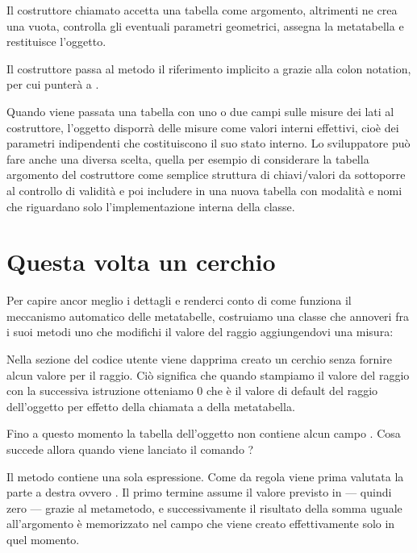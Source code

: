 Il costruttore chiamato  accetta una tabella come argomento, altrimenti
ne crea una vuota, controlla gli eventuali parametri geometrici, assegna la
metatabella e restituisce l'oggetto.

Il costruttore passa al metodo  il riferimento implicito a
 grazie alla colon notation, per cui  punterà a
.

Quando viene passata una tabella con uno o due campi sulle misure dei lati al
costruttore, l'oggetto disporrà delle misure come valori interni effettivi,
cioè dei parametri indipendenti che costituiscono il suo stato interno. Lo
sviluppatore può fare anche una diversa scelta, quella per esempio di
considerare la tabella argomento del costruttore come semplice struttura di
chiavi/valori da sottoporre al controllo di validità e poi includere in una
nuova tabella con modalità e nomi che riguardano solo l'implementazione interna
della classe.


\section{Questa volta un cerchio}

Per capire ancor meglio i dettagli e renderci conto di come funziona il
meccanismo automatico delle metatabelle, costruiamo una classe 
che annoveri fra i suoi metodi uno che modifichi il valore del raggio
aggiungendovi una misura:

Nella sezione del codice utente viene dapprima creato un cerchio senza fornire
alcun valore per il raggio. Ciò significa che quando stampiamo il valore del
raggio con la successiva istruzione otteniamo 0 che è il valore di default del
raggio dell'oggetto  per effetto della chiamata a 
della metatabella.

Fino a questo momento la tabella dell'oggetto  non contiene alcun campo
. Cosa succede allora quando viene lanciato il comando
?

Il metodo  contiene una sola espressione. Come da regola viene
prima valutata la parte a destra ovvero . Il primo termine
assume il valore previsto in  --- quindi zero --- grazie al
metametodo, e successivamente il risultato della somma uguale all'argomento
 è memorizzato nel campo  che viene creato effettivamente
solo in quel momento.



